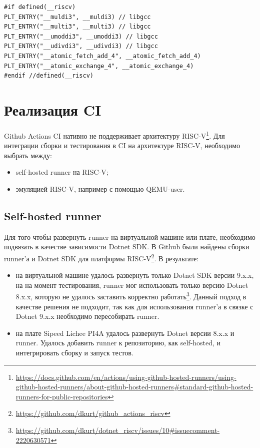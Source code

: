 \begin{lstlisting}[caption={PLT-трамплин}, frame=single, breaklines, basicstyle=\footnotesize]
#if defined(__riscv)
PLT_ENTRY("__muldi3", __muldi3) // libgcc
PLT_ENTRY("__multi3", __multi3) // libgcc
PLT_ENTRY("__umoddi3", __umoddi3) // libgcc
PLT_ENTRY("__udivdi3", __udivdi3) // libgcc
PLT_ENTRY("__atomic_fetch_add_4", __atomic_fetch_add_4)
PLT_ENTRY("__atomic_exchange_4", __atomic_exchange_4)
#endif //defined(__riscv)
\end{lstlisting}

\section{Реализация CI}
Github Actions CI нативно не поддерживает архитектуру RISC-V\footnote{\href{https://docs.github.com/en/actions/using-github-hosted-runners/using-github-hosted-runners/about-github-hosted-runners\#standard-github-hosted-runners-for-public-repositories}{https://docs.github.com/en/actions/using-github-hosted-runners/using-github-hosted-runners/about-github-hosted-runners\#standard-github-hosted-runners-for-public-repositories}}. Для интеграции сборки и тестирования в CI на архитектуре RISC-V, необходимо выбрать между:
\begin{itemize}
    \item self-hosted runner на RISC-V;
    \item эмуляцией RISC-V, например с помощью QEMU-user.
\end{itemize}
\subsection{Self-hosted runner}
Для того чтобы развернуть runner на виртуальной машине или плате, необходимо подвязать в качестве зависимости Dotnet SDK. В Github были найдены сборки runner'а и Dotnet SDK для платформы RISC-V\footnote{\href{https://github.com/dkurt/github\_actions\_riscv}{https://github.com/dkurt/github\_actions\_riscv}}. В результате:
\begin{itemize}
    \item на виртуальной машине удалось развернуть только Dotnet SDK версии 9.x.x, на на момент тестирования, runner мог использовать только версию Dotnet 8.x.x, которую не удалось заставить корректно работать\footnote{\href{https://github.com/dkurt/dotnet\_riscv/issues/10\#issuecomment-2220630571}{https://github.com/dkurt/dotnet\_riscv/issues/10\#issuecomment-2220630571}}. Данный подход в качестве решения не подходит, так как для использования runner'а в связке с Dotnet 9.x.x необходимо пересобирать runner.
    \item на плате Sipeed Lichee PI4A удалось развернуть Dotnet версии 8.x.x и runner. Удалось добавить runner к репозиторию, как self-hosted, и интегрировать сборку и запуск тестов.
\end{itemize}

